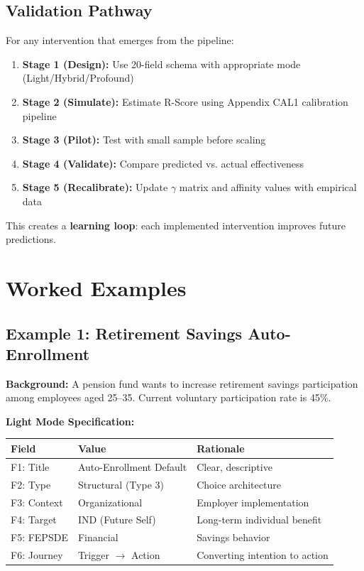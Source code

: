 \subsection{Validation Pathway}

For any intervention that emerges from the pipeline:

\begin{enumerate}
\item \textbf{Stage 1 (Design):} Use 20-field schema with appropriate mode (Light/Hybrid/Profound)
\item \textbf{Stage 2 (Simulate):} Estimate R-Score using Appendix CAL1 calibration pipeline
\item \textbf{Stage 3 (Pilot):} Test with small sample before scaling
\item \textbf{Stage 4 (Validate):} Compare predicted vs. actual effectiveness
\item \textbf{Stage 5 (Recalibrate):} Update $\gamma$ matrix and affinity values with empirical data
\end{enumerate}

This creates a \textbf{learning loop}: each implemented intervention improves future predictions.


\section{Worked Examples}
\label{sec:17-examples}

\subsection{Example 1: Retirement Savings Auto-Enrollment}

\textbf{Background:} A pension fund wants to increase retirement savings participation among employees aged 25--35. Current voluntary participation rate is 45\%.

\textbf{Light Mode Specification:}

\begin{table}[htbp]
\centering
\small
\renewcommand{\arraystretch}{1.3}
\begin{tabular}{@{}llp{6cm}@{}}
\toprule
\textbf{Field} & \textbf{Value} & \textbf{Rationale} \\
\midrule
F1: Title & Auto-Enrollment Default & Clear, descriptive \\
F2: Type & Structural (Type 3) & Choice architecture \\
F3: Context & Organizational & Employer implementation \\
F4: Target & IND (Future Self) & Long-term individual benefit \\
F5: FEPSDE & Financial & Savings behavior \\
F6: Journey & Trigger $\rightarrow$ Action & Converting intention to action \\
\bottomrule
\end{tabular}
\end{table}

